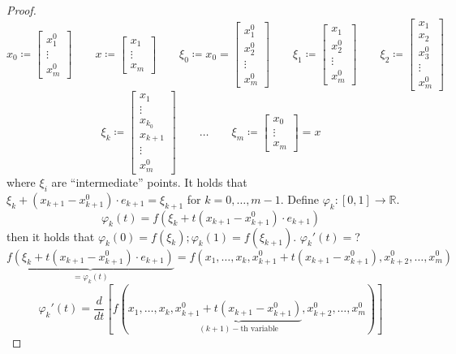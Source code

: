 \documentclass{article}
\begin{document}
\begin{proof}
  \[
    x_0 \coloneqq \begin{bmatrix} x_1^0 \\ \vdots \\ x_m^0 \end{bmatrix} \qquad
    x \coloneqq \begin{bmatrix} x_1 \\ \vdots \\ x_m \end{bmatrix} \qquad
    \xi_0 \coloneqq x_0 = \begin{bmatrix} x_1^0 \\ x_2^0 \\ \vdots \\ x_m^0 \end{bmatrix} \qquad
    \xi_1 \coloneqq \begin{bmatrix} x_1 \\ x_2^0 \\ \vdots \\ x_m^0 \end{bmatrix} \qquad
    \xi_2 \coloneqq \begin{bmatrix} x_1 \\ x_2 \\ x_3^0 \\ \vdots \\ x_m^0 \end{bmatrix} \qquad
  \] \[
    \xi_k \coloneqq \begin{bmatrix} x_1 \\ \vdots \\ x_{k_0} \\ x_{k+1} \\ \vdots \\ x_m^0 \end{bmatrix} \qquad
    \dots \qquad
    \xi_m \coloneqq \begin{bmatrix} x_0 \\ \vdots \\ x_m \end{bmatrix} = x
  \]
  where $\xi_i$ are \enquote{intermediate} points.
  It holds that $\xi_k + (x_{k+1} - x_{k+1}^0) \cdot e_{k+1} = \xi_{k+1}$ for $k = 0, \dots, m-1$.
  Define $\varphi_k: [0,1] \to \mathbb R$.
  \[ \varphi_k(t) = f(\xi_k + t(x_{k+1} - x_{k+1}^0) \cdot e_{k+1}) \]
  then it holds that $\varphi_k(0) = f(\xi_k); \varphi_k(1) = f(\xi_{k+1})$. $\varphi_k'(t) = $?
  \[ \underbrace{f(\xi_k + t(x_{k+1} - x_{k+1}^0) \cdot e_{k+1})}_{= \varphi_k(t)} = f(x_1, \dots, x_k, x_{k+1}^0 + t(x_{k+1} - x_{k+1}^0), x_{k+2}^0, \dots, x_m^0) \]
  \[ \varphi_k'(t) = \frac{d}{dt} \left[f(x_1, \dots, x_k, \underbrace{x_{k+1}^0 + t(x_{k+1} - x_{k+1}^0)}_{(k+1)-\text{th variable}}, x_{k+2}^0, \dots, x_m^0)\right] \]

\end{proof}
\end{document}
